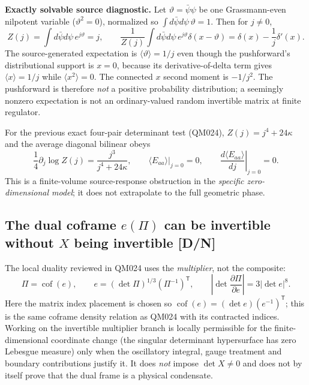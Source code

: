 \documentclass[11pt,a4paper]{article}
\begin{document}
\textbf{Exactly solvable source diagnostic.} Let $\vartheta=\bar\psi\psi$ be one Grassmann-even nilpotent variable ($\vartheta^2=0$), normalized so $\int d\bar\psi d\psi\,\vartheta=1$. Then for $j\ne0$,
\begin{equation}\label{eq:v15-onepair}
Z(j)=\int d\bar\psi d\psi\,e^{j\vartheta}=j,\qquad
\frac1{Z(j)}\int d\bar\psi d\psi\,e^{j\vartheta}\delta(x-\vartheta)
=\delta(x)-\frac1j\delta'(x).
\end{equation}
The source-generated expectation is $\langle\vartheta\rangle=1/j$ even though the pushforward's distributional support is $x=0$, because its derivative-of-delta term gives $\langle x\rangle=1/j$ while $\langle x^2\rangle=0$. The connected $x$ second moment is $-1/j^2$. The pushforward is therefore \emph{not} a positive probability distribution; a seemingly nonzero expectation is not an ordinary-valued random invertible matrix at finite regulator.

For the previous exact four-pair determinant test (QM024), $Z(j)=j^4+24\kappa$ and the average diagonal bilinear obeys
\begin{equation}\label{eq:v15-fourpair}
\frac14\partial_j\log Z(j)=\frac{j^3}{j^4+24\kappa},\qquad
\left.\langle E_{aa}\rangle\right|_{j=0}=0,\qquad
\left.\frac{d\langle E_{aa}\rangle}{dj}\right|_{j=0}=0.
\end{equation}
This is a finite-volume source-response obstruction in the \emph{specific zero-dimensional model}; it does not extrapolate to the full geometric phase.

\subsection{The dual coframe $e(\Pi)$ can be invertible without $X$ being invertible [D/N]}
\label{sec:v15-dual}
The local duality reviewed in QM024 uses the \emph{multiplier}, not the composite:
\begin{equation}\label{eq:v15-frame-dual}
\Pi=\operatorname{cof}(e),\qquad e=(\det\Pi)^{1/3}(\Pi^{-1})^{\mathsf T},\qquad
\left|\det\frac{\partial\Pi}{\partial e}\right|=3|\det e|^8.
\end{equation}
Here the matrix index placement is chosen so $\operatorname{cof}(e)=(\det e)(e^{-1})^{\mathsf T}$; this is the same coframe density relation as QM024 with its contracted indices. Working on the invertible multiplier branch is locally permissible for the finite-dimensional coordinate change (the singular determinant hypersurface has zero Lebesgue measure) only when the oscillatory integral, gauge treatment and boundary contributions justify it. It does \emph{not} impose $\det X\ne0$ and does not by itself prove that the dual frame is a physical condensate.
\end{document}
